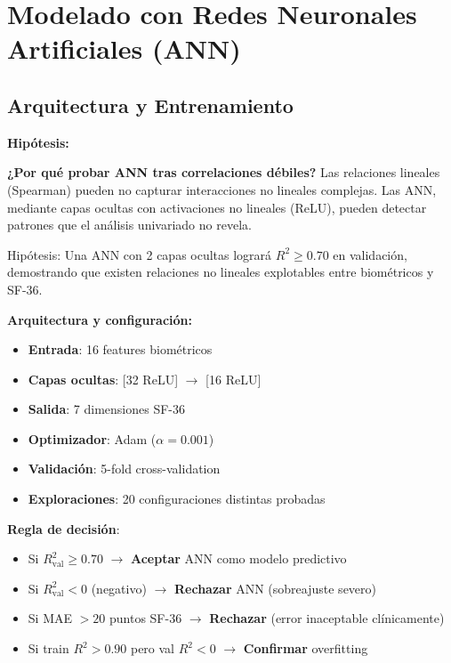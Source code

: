 \documentclass[12pt,letterpaper,twoside]{report}
\begin{document}
\section{Modelado con Redes Neuronales Artificiales (ANN)}

\subsection{Arquitectura y Entrenamiento}

\begin{hipotesisbox}
\textbf{Hipótesis:}

\textbf{¿Por qué probar ANN tras correlaciones débiles?} Las relaciones lineales (Spearman) pueden no capturar interacciones no lineales complejas. Las ANN, mediante capas ocultas con activaciones no lineales (ReLU), pueden detectar patrones que el análisis univariado no revela.

Hipótesis: Una ANN con 2 capas ocultas logrará $R^2 \geq 0.70$ en validación, demostrando que existen relaciones no lineales explotables entre biométricos y SF-36.
\end{hipotesisbox}

\begin{estadisticobox}
\textbf{Arquitectura y configuración:}

\begin{itemize}[noitemsep]
    \item \textbf{Entrada}: 16 features biométricos
    \item \textbf{Capas ocultas}: [32 ReLU] $\to$ [16 ReLU]
    \item \textbf{Salida}: 7 dimensiones SF-36
    \item \textbf{Optimizador}: Adam ($\alpha=0.001$)
    \item \textbf{Validación}: 5-fold cross-validation
    \item \textbf{Exploraciones}: 20 configuraciones distintas probadas
\end{itemize}
\end{estadisticobox}

\begin{reglabox}
\textbf{Regla de decisión}:

\begin{itemize}[noitemsep]
    \item Si $R^2_{\text{val}} \geq 0.70$ $\to$ \textbf{Aceptar} ANN como modelo predictivo
    \item Si $R^2_{\text{val}} < 0$ (negativo) $\to$ \textbf{Rechazar} ANN (sobreajuste severo)
    \item Si MAE $> 20$ puntos SF-36 $\to$ \textbf{Rechazar} (error inaceptable clínicamente)
    \item Si train $R^2 > 0.90$ pero val $R^2 < 0$ $\to$ \textbf{Confirmar} overfitting
\end{itemize}
\end{reglabox}
\end{document}
